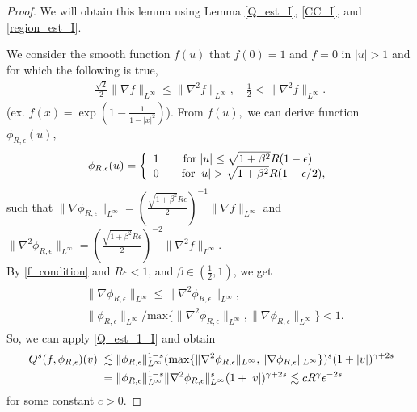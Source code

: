 \documentclass[reqno,10pt]{amsart}
\numberwithin{equation}{section}
\begin{document}
\begin{proof} 
We will obtain this lemma using Lemma \ref{Q_est_I}, \ref{CC_I}, and \ref{region_est_I}. \vspace{3mm}

\noindent We consider the smooth function  $f(u)$ that $f(0)=1$ and $f=0$ in $|u|>1$ and for which the following is true, 
\begin{align} \label{f_condition}
    \frac{\sqrt{2}}{2}\|\nabla f\|_{L^\infty} \leq  \|\nabla^2 f \|_{L^\infty}, \quad \frac{1}{2} < \|\nabla^2 f \|_{L^\infty}.
\end{align} (ex. $f(x)= \exp({1-\frac{1}{1-|x|^2}})$).
From $f(u),$ we can derive function $\phi_{R,\epsilon}(u),$
\begin{align} \label{phi_spreading_nc_I}
    \phi_{R,\epsilon}(u) =
     \left\{ \begin{array}{rcl}1 & \mbox{for} \; |u|\leq\sqrt{1+\beta^2}R(1-\epsilon)\\
0 & \mbox{\quad for} \;|u|> \sqrt{1+\beta^2}R(1-\epsilon/2),
\end{array}\right.
\end{align} such that $\| \nabla\phi_{R,\epsilon}\|_{L^\infty}=(\frac{\sqrt{1+\beta^2}R\epsilon}{2})^{-1}\|\nabla f\|_{L^\infty}$ and $\|\nabla^2 \phi_{R,\epsilon}\|_{L^\infty}=(\frac{\sqrt{1+\beta^2}R\epsilon}{2})^{-2}\|\nabla^2 f \|_{L^\infty}.$ \\ By \eqref{f_condition} and $R\epsilon <1$, and $\beta \in (\frac{1}{2},1)$, we get
\begin{align} \label{phi condition}
\begin{split}
    &\| \nabla\phi_{R,\epsilon}\|_{L^\infty} \leq \|\nabla^2 \phi_{R,\epsilon}\|_{L^\infty}, \\
    &\|\phi_{R,\epsilon}\|_{L^{\infty}}/\text{max}\{\|\nabla^2 \phi_{R,\epsilon}\|_{L^\infty}, \|\nabla \phi_{R,\epsilon}\|_{L^\infty} \}< 1. 
\end{split}
\end{align} So, we can apply \eqref{Q_est_1_I} and obtain
\begin{align}
  |Q^{s}(f,\phi_{R,\epsilon})(v)| 
    &\lesssim
  \|\phi_{R,\epsilon}\|_{L^{\infty}}^{1-s}(\text{max}\{\|\nabla^2 \phi_{R,\epsilon}\|_{L^\infty}, \|\nabla \phi_{R,\epsilon}\|_{L^\infty} \})^{s}(1+|v|)^{\gamma+2s}  \notag \\
    &= \|\phi_{R,\epsilon}\|_{L^{\infty}}^{1-s}\|\nabla^2 \phi_{R,\epsilon}\|_{L^\infty}^{s}(1+|v|)^{\gamma+2s}
  \lesssim cR^\gamma \epsilon^{-2s} \label{Qs_est_spreading_I}
\end{align}for some constant $c>0$. \vspace{4mm}


\end{proof}
\end{document}
